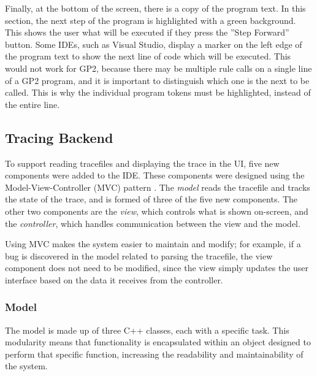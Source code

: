 \documentclass[authoryearcitations]{UoYCSproject}
\begin{document}
Finally, at the bottom of the screen, there is a copy of the program text. In this
section, the next step of the program is highlighted with a green background. This
shows the user what will be executed if they press the ''Step Forward'' button. Some
IDEs, such as Visual Studio, display a marker on the left edge of the program text
to show the next line of code which will be executed. This would not work for GP2,
because there may be multiple rule calls on a single line of a GP2 program, and it
is important to distinguish which one is the next to be called. This is why the
individual program tokens must be highlighted, instead of the entire line.

\subsection{Tracing Backend}
\label{sec:TracingBackend}

To support reading tracefiles and displaying the trace in the UI, five new
components were added to the IDE. These components were designed using the
Model-View-Controller (MVC) pattern \citep{mvc}. The \emph{model} reads the
tracefile and tracks the state of the trace, and is formed of three of the
five new components. The other two components are the \emph{view}, which
controls what is shown on-screen, and the \emph{controller}, which handles
communication between the view and the model.

Using MVC makes the system easier to maintain and modify; for example, if a bug
is discovered in the model related to parsing the tracefile, the view component
does not need to be modified, since the view simply updates the user interface
based on the data it receives from the controller.

\subsubsection{Model}
\label{sec:MVCModel}

The model is made up of three C++ classes, each with a specific task. This
modularity means that functionality is encapsulated within an object designed
to perform that specific function, increasing the readability and maintainability
of the system.
\end{document}
